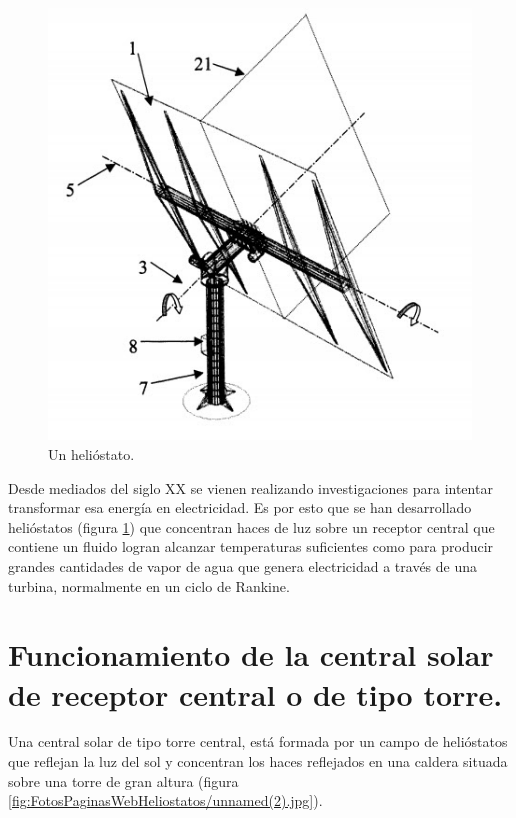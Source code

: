 \begin{figure}[h!]
  	\centering
	\includegraphics[scale=0.7]{FotosPaginasWebHeliostatos/unnamed.jpg}
	\caption{Un helióstato.~\cite{OepmWebSite} \label{fig:FotosPaginasWebHeliostatos/unnamed.jpg}}
\end{figure}

Desde mediados del siglo XX se vienen realizando investigaciones para intentar transformar esa energía en electricidad. Es por esto que se han desarrollado helióstatos (figura \ref{fig:FotosPaginasWebHeliostatos/unnamed.jpg}) que concentran haces de luz sobre un receptor central que contiene un fluido logran alcanzar temperaturas suficientes como para producir grandes cantidades de vapor de agua que genera electricidad a través de una turbina, normalmente en un ciclo de Rankine.

\cite{GstriatumWebSite} \cite{EcuRedWebSite}

\section{Funcionamiento de la central solar de receptor central o de tipo torre.}

Una central solar de tipo torre central, está formada por un campo de helióstatos que reflejan la luz del sol y concentran los haces reflejados en una caldera situada sobre una torre de gran altura (figura \ref{fig:FotosPaginasWebHeliostatos/unnamed(2).jpg}).

